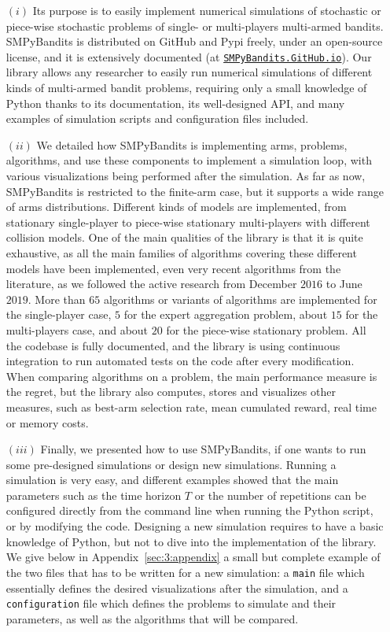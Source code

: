 \begin{itemize}
    \item[$(i)$]
Its purpose is to easily implement numerical simulations of stochastic or piece-wise stochastic problems of single- or multi-players multi-armed bandits.
SMPyBandits is distributed on GitHub and Pypi freely, under an open-source license, and it is extensively documented (at \href{https://SMPyBandits.GitHub.io}{\texttt{SMPyBandits.GitHub.io}}).
Our library allows any researcher to easily run numerical simulations of different kinds of multi-armed bandit problems, requiring only a small knowledge of Python thanks to its documentation, its well-designed API, and many examples of simulation scripts and configuration files included.

    \item[$(ii)$]
We detailed how SMPyBandits is implementing arms, problems, algorithms, and use these components to implement a simulation loop, with various visualizations being performed after the simulation.
As far as now, SMPyBandits is restricted to the finite-arm case, but it supports a wide range of arms distributions.
Different kinds of models are implemented, from stationary single-player to piece-wise stationary multi-players with different collision models.
One of the main qualities of the library is that it is quite exhaustive, as all the main families of algorithms covering these different models have been implemented, even very recent algorithms from the literature, as we followed the active research from December $2016$ to June $2019$.
More than $65$ algorithms or variants of algorithms are implemented for the single-player case, $5$ for the expert aggregation problem, about $15$ for the multi-players case, and about $20$ for the piece-wise stationary problem.
All the codebase is fully documented, and the library is using continuous integration to run automated tests on the code after every modification.
%
When comparing algorithms on a problem, the main performance measure is the regret, but the library also computes, stores and visualizes other measures, such as best-arm selection rate, mean cumulated reward, real time or memory costs.

    \item[$(iii)$]
Finally, we presented how to use SMPyBandits, if one wants to run some pre-designed simulations or design new simulations.
Running a simulation is very easy, and different examples showed that the main parameters such as the time horizon $T$ or the number of repetitions can be configured directly from the command line when running the Python script, or by modifying the code.
Designing a new simulation requires to have a basic knowledge of Python, but not to dive into the implementation of the library.
We give below in Appendix~\ref{sec:3:appendix} a small but complete example of the two files that has to be written for a new simulation: a \texttt{main} file which essentially defines the desired visualizations after the simulation, and a \texttt{configuration} file which defines the problems to simulate and their parameters, as well as the algorithms that will be compared.
\end{itemize}


